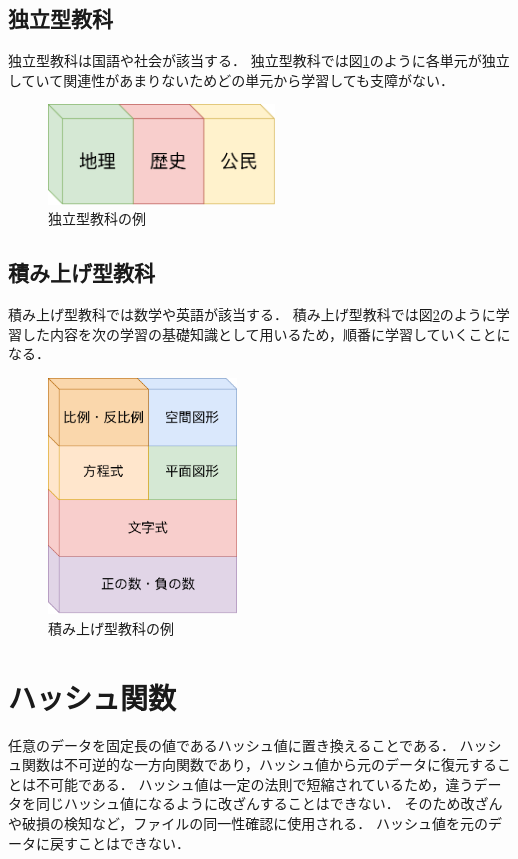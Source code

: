 \documentclass[a4j,12pt]{jsarticle}
\begin{document}
\subsection{独立型教科}
独立型教科は国語や社会が該当する．
独立型教科では図\ref{fig:01}のように各単元が独立していて関連性があまりないためどの単元から学習しても支障がない．\\
\begin{figure}[H]
\centering
\includegraphics[width=6cm]{01.pdf}
\caption{独立型教科の例}
\label{fig:01}
\end{figure} 

\subsection{積み上げ型教科}
積み上げ型教科では数学や英語が該当する．
積み上げ型教科では図\ref{fig:04}のように学習した内容を次の学習の基礎知識として用いるため，順番に学習していくことになる．\\

\begin{figure}[H]
\centering
\includegraphics[width=5cm]{04.pdf}
\caption{積み上げ型教科の例}
\label{fig:04}
\end{figure} 

\newpage
\section{ハッシュ関数}

任意のデータを固定長の値であるハッシュ値に置き換えることである．
ハッシュ関数は不可逆的な一方向関数であり，ハッシュ値から元のデータに復元することは不可能である．
ハッシュ値は一定の法則で短縮されているため，違うデータを同じハッシュ値になるように改ざんすることはできない．
そのため改ざんや破損の検知など，ファイルの同一性確認に使用される．
ハッシュ値を元のデータに戻すことはできない．\\
\end{document}
